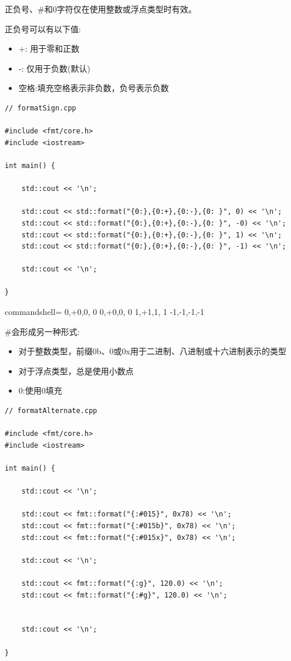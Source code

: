 正负号、\#和0字符仅在使用整数或浮点类型时有效。

正负号可以有以下值:

\begin{itemize}
\item 
+: 用于零和正数

\item 
-: 仅用于负数(默认)

\item 
空格:填充空格表示非负数，负号表示负数
\end{itemize}

\begin{lstlisting}[style=styleCXX]
// formatSign.cpp

#include <fmt/core.h>
#include <iostream>

int main() {
	
	std::cout << '\n';
	
	std::cout << std::format("{0:},{0:+},{0:-},{0: }", 0) << '\n';
	std::cout << std::format("{0:},{0:+},{0:-},{0: }", -0) << '\n';
	std::cout << std::format("{0:},{0:+},{0:-},{0: }", 1) << '\n';
	std::cout << std::format("{0:},{0:+},{0:-},{0: }", -1) << '\n';
	
	std::cout << '\n';
	
}
\end{lstlisting}

\begin{tcblisting}{commandshell={}}
0,+0,0, 0
0,+0,0, 0
1,+1,1, 1
-1,-1,-1,-1
\end{tcblisting}


\#会形成另一种形式:

\begin{itemize}
\item 
对于整数类型，前缀0b、0或0x用于二进制、八进制或十六进制表示的类型

\item 
对于浮点类型，总是使用小数点

\item 
0:使用0填充
\end{itemize}

\begin{lstlisting}[style=styleCXX]
// formatAlternate.cpp

#include <fmt/core.h>
#include <iostream>

int main() {

	std::cout << '\n';
	
	std::cout << fmt::format("{:#015}", 0x78) << '\n';
	std::cout << fmt::format("{:#015b}", 0x78) << '\n';
	std::cout << fmt::format("{:#015x}", 0x78) << '\n';
	
	std::cout << '\n';
	
	std::cout << fmt::format("{:g}", 120.0) << '\n';
	std::cout << fmt::format("{:#g}", 120.0) << '\n';
	
	
	std::cout << '\n';

}
\end{lstlisting}

